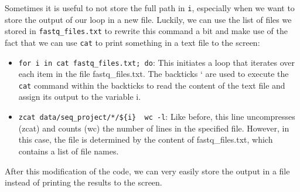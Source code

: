 \documentclass[
  letterpaper,
  DIV=11,
  numbers=noendperiod]{scrreprt}
\newenvironment{Shaded}{}{}
\newcommand{\AttributeTok}[1]{\textcolor[rgb]{0.84,0.23,0.29}{#1}}
\newcommand{\CommentTok}[1]{\textcolor[rgb]{0.42,0.45,0.49}{#1}}
\newcommand{\ControlFlowTok}[1]{\textcolor[rgb]{0.84,0.23,0.29}{#1}}
\newcommand{\FunctionTok}[1]{\textcolor[rgb]{0.44,0.26,0.76}{#1}}
\newcommand{\KeywordTok}[1]{\textcolor[rgb]{0.84,0.23,0.29}{#1}}
\newcommand{\NormalTok}[1]{\textcolor[rgb]{0.14,0.16,0.18}{#1}}
\newcommand{\OperatorTok}[1]{\textcolor[rgb]{0.14,0.16,0.18}{#1}}
\newcommand{\PreprocessorTok}[1]{\textcolor[rgb]{0.84,0.23,0.29}{#1}}
\newcommand{\VariableTok}[1]{\textcolor[rgb]{0.89,0.38,0.04}{#1}}
\providecommand{\tightlist}{%
  \setlength{\itemsep}{0pt}\setlength{\parskip}{0pt}}\usepackage{longtable,booktabs,array}
\begin{document}
Sometimes it is useful to not store the full path in \texttt{i},
especially when we want to store the output of our loop in a new file.
Luckily, we can use the list of files we stored in
\texttt{fastq\_files.txt} to rewrite this command a bit and make use of
the fact that we can use \texttt{cat} to print something in a text file
to the screen:

\begin{Shaded}
\end{Shaded}

\begin{itemize}
\tightlist
\item
  \texttt{for\ i\ in\ \textasciigrave{}cat\ fastq\_files.txt\textasciigrave{};\ do}:
  This initiates a loop that iterates over each item in the file
  fastq\_files.txt. The backticks ` are used to execute the \texttt{cat}
  command within the backticks to read the content of the text file and
  assign its output to the variable i.
\item
  \texttt{zcat\ data/seq\_project/*/\$\{i\}\ \textbar{}\ wc\ -l}: Like
  before, this line uncompresses (zcat) and counts (wc) the number of
  lines in the specified file. However, in this case, the file is
  determined by the content of fastq\_files.txt, which contains a list
  of file names.
\end{itemize}

After this modification of the code, we can very easily store the output
in a file instead of printing the results to the screen.

\begin{Shaded}
\end{Shaded}
\end{document}
